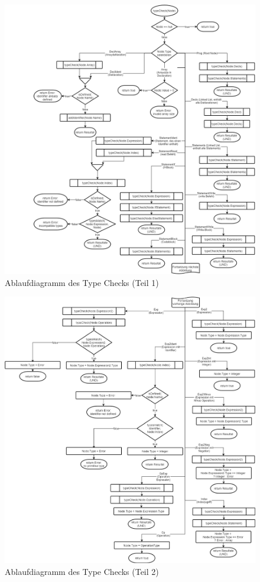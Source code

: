 \documentclass[
	a4paper
]{scrreprt}
\begin{document}
\begin{figure}[htbp]
\centering
\includegraphics[width=\textwidth]{./images/TypeCheck1.png}
\caption{Ablaufdiagramm des Type Checks (Teil 1)}
\label{TypeCheck1}
\end{figure}

\begin{figure}[htbp]
\centering
\includegraphics[width=\textwidth]{./images/TypeCheck2.png}
\caption{Ablaufdiagramm des Type Checks (Teil 2)}
\label{TypeCheck2}
\end{figure}
\end{document}
